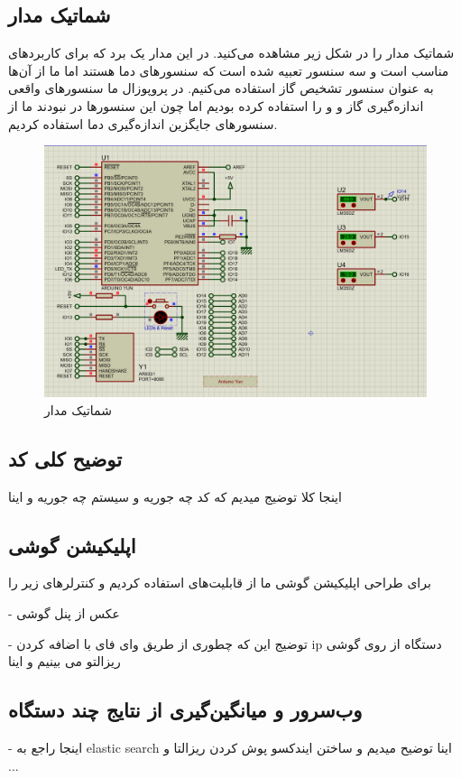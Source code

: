 \subsection{شماتیک مدار}
شماتیک مدار را در شکل زیر مشاهده می‌کنید. در این مدار یک برد 
که برای کاربرد‌های 
مناسب است و سه سنسور
تعبیه شده است که سنسور‌های دما هستند اما ما از آن‌ها به عنوان سنسور تشخیص گاز استفاده می‌کنیم. در پروپوزال ما سنسور‌های واقعی اندازه‌گیری گاز 
و 
و
را استفاده کرده بودیم اما چون این سنسور‌ها در 
نبودند ما از سنسور‌های جایگزین اندازه‌گیری دما استفاده کردیم.
\begin{figure}[h!]
	\centering		
	\includegraphics[width=\linewidth]{figs/circuit.png}
	\caption{شماتیک مدار}
\end{figure}

\subsection{توضیح کلی کد}
اینجا کلا توضیج میدیم که کد چه جوریه و سیستم چه جوریه و اینا

\subsection{اپلیکیشن گوشی}
برای طراحی اپلیکیشن گوشی ما از قابلیت‌های 
استفاده کردیم و کنترلر‌های 
زیر را 

- عکس از پنل گوشی

- توضیج این که چطوری از طریق وای فای با اضافه کردن ip دستگاه از روی گوشی ریزالتو می بینیم و اینا

\subsection{وب‌سرور و میانگین‌گیری از نتایج چند دستگاه}
- اینجا راجع به  
elastic search
 اینا توضیح میدیم و ساختن ایندکسو پوش کردن ریزالتا و ...

